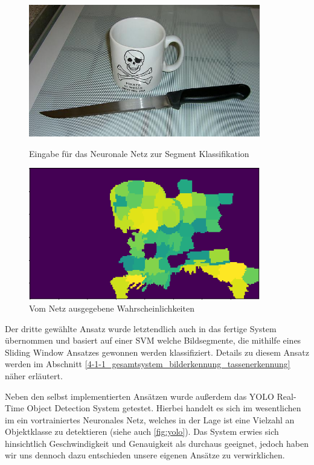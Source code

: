 \begin{figure}
    \centering
    \begin{minipage}{0.45\textwidth}
        \centering
        \includegraphics[width=0.9\textwidth]{images/cup_patches.jpg} %
        \caption{Eingabe für das Neuronale Netz zur Segment Klassifikation \label{fig:patches_prediction}}
    \end{minipage}\hfill
    \begin{minipage}{0.48\textwidth}
        \centering
        \includegraphics[width=0.9\textwidth]{images/cup_patches_prediction.png} %
        \caption{Vom Netz ausgegebene Wahrscheinlichkeiten \label{fig:patches_prediction_result}}
    \end{minipage}
\end{figure}

Der dritte gewählte Ansatz wurde letztendlich auch in das fertige System übernommen und basiert auf einer SVM welche Bildsegmente, die mithilfe eines Sliding Window Ansatzes gewonnen werden klassifiziert. Details zu diesem Ansatz werden im Abschnitt \ref{4-1-1_gesamtsystem_bilderkennung_tassenerkennung} näher erläutert.

Neben den selbst implementierten Ansätzen wurde außerdem das YOLO Real-Time Object Detection System getestet. Hierbei handelt es sich im wesentlichen im ein vortrainiertes Neuronales Netz, welches in der Lage ist eine Vielzahl an Objektklasse zu detektieren (siehe auch \ref{fig:yolo}). Das System erwies sich hinsichtlich Geschwindigkeit und Genauigkeit als durchaus geeignet, jedoch haben wir uns dennoch dazu entschieden unsere eigenen Ansätze zu verwirklichen.

